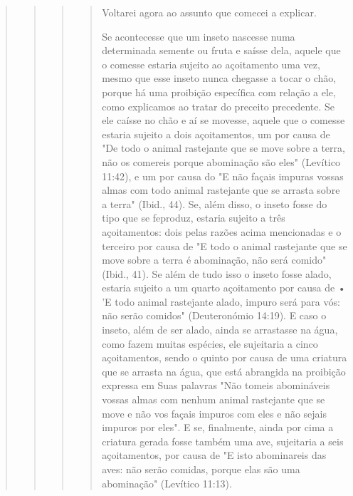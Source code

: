 \begin{quote}
\begin{quote}
\begin{quote}
\begin{quote}
Voltarei agora ao assunto que comecei a explicar.


Se acontecesse que um inseto nascesse numa determinada semente ou fruta
e saísse dela, aquele que o comesse estaria sujeito ao açoitamento uma
vez, mesmo que esse inseto nunca chegasse a tocar o chão, porque há uma
proi­bição específica com relação a ele, como explicamos ao tratar do
preceito prece­dente. Se ele caísse no chão e aí se movesse, aquele que
o comesse estaria sujeito a dois açoitamentos, um por causa de "De todo
o animal rastejante que se move sobre a terra, não os comereis porque
abominação são eles" (Levítico 11:42), e um por causa do "E não façais
impuras vossas almas com todo animal rastejante que se arrasta sobre a
terra" (Ibid., 44). Se, além disso, o inseto fosse do tipo que se
feproduz, estaria sujeito a três açoitamentos: dois pelas razões acima
mencio­nadas e o terceiro por causa de "E todo o animal rastejante que
se move sobre a terra é abominação, não será comido" (Ibid., 41). Se
além de tudo isso o inseto fosse alado, estaria sujeito a um quarto
açoitamento por causa de • 'E todo animal rastejante alado, impuro será
para vós: não serão comidos" (Deuteronómio 14:19). E caso o inseto, além
de ser alado, ainda se arrastasse na água, como fazem muitas espécies,
ele sujeitaria a cinco açoitamentos, sendo o quinto por causa de uma
criatura que se arrasta na água, que está abrangida na proibição
expressa em Suas palavras "Não tomeis abomináveis vossas almas com
nenhum animal rastejante que se move e não vos façais impuros com eles e
não sejais impuros por eles". E se, finalmente, ainda por cima a
criatura gerada fosse também uma ave, sujeita­ria a seis açoitamentos,
por causa de "E isto abominareis das aves: não serão co­midas, porque
elas são uma abominação" (Levítico 11:13).


\end{quote}
\end{quote}
\end{quote}
\end{quote}
